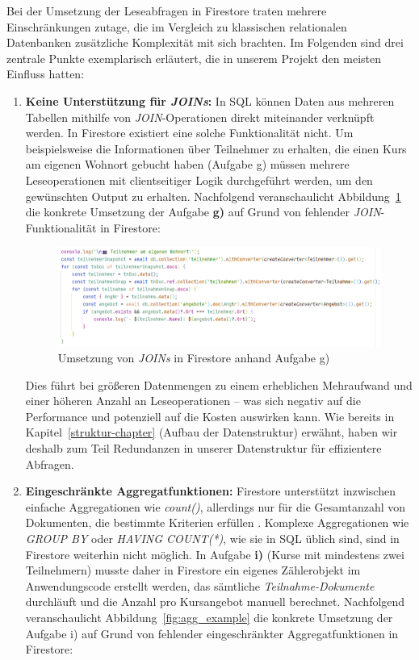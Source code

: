 \documentclass[12pt,a4paper%
              ,oneside     %
              ,titlepage
              ,DIV=13
              ,headinclude
              ,footinclude=false%
              ,cleardoublepage=empty%
              ,parskip=half,
              BCOR=0mm,
              ]{scrreprt}
\begin{document}
Bei der Umsetzung der Leseabfragen in Firestore traten mehrere Einschränkungen zutage, die im Vergleich zu klassischen relationalen Datenbanken zusätzliche Komplexität mit sich brachten. Im Folgenden sind drei zentrale Punkte exemplarisch erläutert, die in unserem Projekt den meisten Einfluss hatten:

\begin{enumerate}
	\item \textbf{Keine Unterstützung für \textit{JOINs}:} 
	In SQL können Daten aus mehreren Tabellen mithilfe von \textit{JOIN}-Operationen direkt miteinander verknüpft werden. In Firestore existiert eine solche Funktionalität nicht. Um beispielsweise die Informationen über Teilnehmer zu erhalten, die einen Kurs am eigenen Wohnort gebucht haben (Aufgabe g) müssen mehrere Leseoperationen mit clientseitiger Logik durchgeführt werden, um den gewünschten Output zu erhalten. Nachfolgend veranschaulicht Abbildung~\ref{fig:join_example} die konkrete Umsetzung der Aufgabe \textbf{g)} auf Grund von fehlender \textit{JOIN}-Funktionalität in Firestore:
	
	\begin{figure}[H]
		\centering
		\includegraphics[width=\dimexpr0.9\linewidth]{img/g_join_example.png}
		\caption{Umsetzung von \textit{JOINs} in Firestore anhand Aufgabe g)}
		\label{fig:join_example}
	\end{figure}
	
	Dies führt bei größeren Datenmengen zu einem erheblichen Mehraufwand und einer höheren Anzahl an Leseoperationen – was sich negativ auf die Performance und potenziell auf die Kosten auswirken kann. Wie bereits in Kapitel~\ref{struktur-chapter} (\glqq Aufbau der Datenstruktur\grqq{}) erwähnt, haben wir deshalb zum Teil Redundanzen in unserer Datenstruktur für effizientere Abfragen.\newline
	
	\item \textbf{Eingeschränkte Aggregatfunktionen:}
    Firestore unterstützt inzwischen einfache Aggregationen wie \textit{count()}, allerdings nur für die Gesamtanzahl von Dokumenten, die bestimmte Kriterien erfüllen \cite{FirebaseCount.2025}. Komplexe Aggregationen wie \textit{GROUP BY} oder \textit{HAVING COUNT(*)}, wie sie in SQL üblich sind, sind in Firestore weiterhin nicht möglich. In Aufgabe \textbf{i)} (Kurse mit mindestens zwei Teilnehmern) musste daher in Firestore ein eigenes Zählerobjekt im Anwendungscode erstellt werden, das sämtliche \textit{Teilnahme-Dokumente} durchläuft und die Anzahl pro Kursangebot manuell berechnet. Nachfolgend veranschaulicht Abbildung~\ref{fig:agg_example} die konkrete Umsetzung der Aufgabe i) auf Grund von fehlender eingeschränkter Aggregatfunktionen in Firestore:
    

\end{enumerate}
\end{document}
